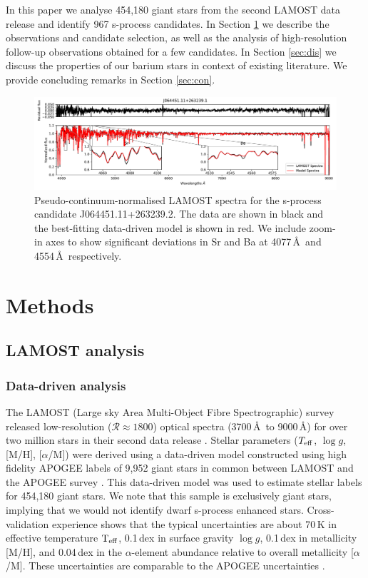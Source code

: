\documentclass[a4paper,fleqn,usenatbib]{mnras}
\begin{document}
In this paper we analyse 454,180 giant stars from the second LAMOST data release \citep{luo2015} and identify 967 s-process candidates. In Section \ref{sec:methods} we describe the observations and candidate selection, as well as the analysis of high-resolution follow-up observations obtained for a few candidates. In Section \ref{sec:dis} we discuss the properties of our barium stars in context of existing literature. We provide concluding remarks in Section \ref{sec:con}.

\begin{figure}
	\includegraphics[width=\textwidth]{posterchild_final.pdf}
    \caption{Pseudo-continuum-normalised LAMOST spectra for the s-process candidate J064451.11+263239.2. The data are shown in black and the best-fitting data-driven model is shown in red. We include zoom-in axes to show significant deviations in Sr and Ba at  4077\,\AA\ and 4554\,\AA\, respectively.}
    \label{fig:figure1}
\end{figure}

\section{Methods} \label{sec:methods}
\subsection{LAMOST analysis}
\subsubsection{Data-driven analysis}
The LAMOST (Large sky Area Multi-Object Fibre Spectrographic) survey released low-resolution ($\mathcal{R} \approx 1800$) optical spectra (3700\,\AA\ to 9000\,\AA) for over two million stars in their second data release \citep{luo2015}. Stellar parameters ($T_{\rm eff}$, $\log{g}$, [M/H], [$\alpha$/M]) were derived using a data-driven model constructed using high fidelity APOGEE labels of 9,952 giant stars in common between LAMOST and the APOGEE survey \citep{ho2017}. This data-driven model was used to estimate stellar labels for 454,180 giant stars. We note that this sample is exclusively giant stars, implying that we would not identify dwarf s-process enhanced stars. Cross-validation experience shows that the typical uncertainties are about 70\,K in effective temperature $\rm T_{\rm eff}$, 0.1\,dex in surface gravity $\log{g}$, 0.1\,dex in metallicity [M/H], and 0.04\,dex in the $\alpha$-element abundance relative to overall metallicity [$\alpha$/M]. These uncertainties are comparable to the APOGEE uncertainties \citep{alam2015}.
\end{document}
